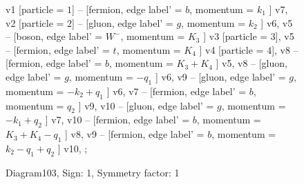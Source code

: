\documentclass{revtex4}
\begin{document}
\begin{figure}[!htb]
\begin{center}
{    %
v1 [particle = \(1\)] -- [fermion, edge label' = \(b\), momentum = \(k_{1}\) ] v7, 
v2 [particle = \(2\)] -- [gluon, edge label' = \(g\), momentum = \(k_{2}\) ] v6, 
v5 -- [boson, edge label' = \(W^{-}\), momentum = \(K_{3}\) ] v3 [particle = \(3\)], 
v5 -- [fermion, edge label' = \(t\), momentum = \(K_{4}\) ] v4 [particle = \(4\)], 
v8 -- [fermion, edge label' = \(b\), momentum = \(K_{3} + K_{4}\) ] v5, 
v8 -- [gluon, edge label' = \(g\), momentum = \(-q_{1}\) ] v6, 
v9 -- [gluon, edge label' = \(g\), momentum = \(-k_{2} + q_{1}\) ] v6, 
v7 -- [fermion, edge label' = \(b\), momentum = \(q_{2}\) ] v9, 
v10 -- [gluon, edge label' = \(g\), momentum = \(-k_{1} + q_{2}\) ] v7, 
v10 -- [fermion, edge label' = \(b\), momentum = \(K_{3} + K_{4} - q_{1}\) ] v8, 
v9 -- [fermion, edge label' = \(b\), momentum = \(k_{2} - q_{1} + q_{2}\) ] v10, 
};
\end{center}
\caption{Diagram103, Sign: 1, Symmetry factor: 1}
\end{figure}
\newpage
\end{document}
